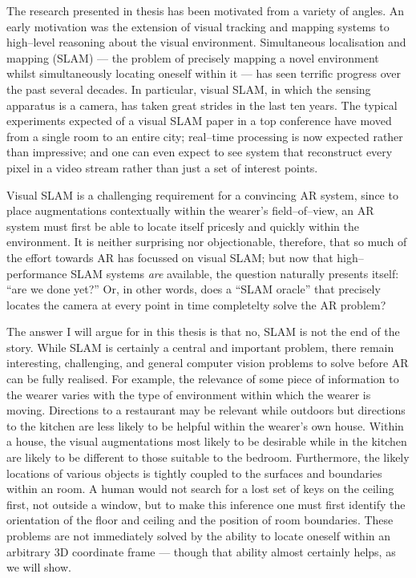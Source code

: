 %



The research presented in thesis has been motivated from a variety of
angles. An early motivation was the extension of visual tracking and
mapping systems to high--level reasoning about the visual
environment. Simultaneous localisation and mapping (SLAM) --- the
problem of precisely mapping a novel environment whilst simultaneously
locating oneself within it --- has seen terrific progress over the
past several decades. In particular, visual SLAM, in which the sensing
apparatus is a camera, has taken great strides in the last ten
years. The typical experiments expected of a visual SLAM paper in a
top conference have moved from a single room to an entire city;
real--time processing is now expected rather than impressive; and one
can even expect to see system that reconstruct every pixel in a video
stream rather than just a set of interest points.

Visual SLAM is a challenging requirement for a convincing AR system,
since to place augmentations contextually within the wearer's
field--of--view, an AR system must first be able to locate itself
pricesly and quickly within the environment. It is neither surprising
nor objectionable, therefore, that so much of the effort towards AR
has focussed on visual SLAM; but now that high--performance SLAM
systems \textit{are} available, the question naturally presents
itself: ``are we done yet?'' Or, in other words, does a ``SLAM
oracle'' that precisely locates the camera at every point in time
completelty solve the AR problem?

The answer I will argue for in this thesis is that no, SLAM is not the
end of the story. While SLAM is certainly a central and important
problem, there remain interesting, challenging, and general computer
vision problems to solve before AR can be fully realised. For example,
the relevance of some piece of information to the wearer varies with
the type of environment within which the wearer is moving. Directions
to a restaurant may be relevant while outdoors but directions to the
kitchen are less likely to be helpful within the wearer's own
house. Within a house, the visual augmentations most likely to be
desirable while in the kitchen are likely to be different to those
suitable to the bedroom. Furthermore, the likely locations of various
objects is tightly coupled to the surfaces and boundaries within an
room. A human would not search for a lost set of keys on the ceiling
first, not outside a window, but to make this inference one must first
identify the orientation of the floor and ceiling and the position of
room boundaries. These problems are not immediately solved by the
ability to locate oneself within an arbitrary 3D coordinate frame ---
though that ability almost certainly helps, as we will show.

